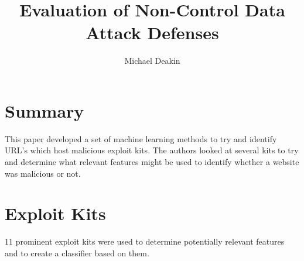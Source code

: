 \documentclass{article}
\title{Evaluation of Non-Control Data Attack Defenses}
\author{Michael Deakin}
\begin{document}
\maketitle
\section{Summary}
This paper developed a set of machine learning methods to try and identify URL's which host malicious exploit kits.
The authors looked at several kits to try and determine what relevant features might be used to identify whether a website was malicious or not.
\section{Exploit Kits}
11 prominent exploit kits were used to determine potentially relevant features and to create a classifier based on them.
\end{document}
